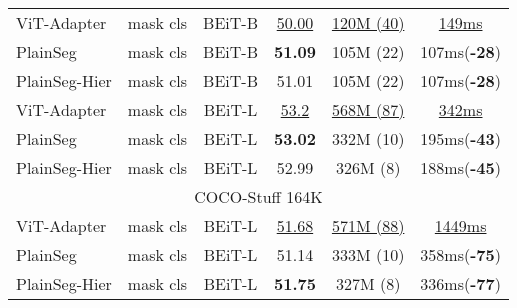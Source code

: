 \documentclass{article} \usepackage{iclr2024_conference,times}
\begin{document}
\begin{table}[h]
\begin{center}
\begin{tabular}{l|ccccc}
ViT-Adapter  &mask cls  &BEiT-B &\uline{50.00} &\uline{120M (40)}  & \uline{149ms}\\
PlainSeg &mask cls &BEiT-B &\textbf{51.09}  &105M (22) &107ms(\textbf{-28})  \\
PlainSeg-Hier &mask cls &BEiT-B &51.01  &105M (22) &107ms(\textbf{-28})  \\
ViT-Adapter  &mask cls  &BEiT-L &\uline{53.2} &\uline{568M (87)}   &\uline{342ms}\\
PlainSeg &mask cls &BEiT-L &\textbf{53.02}  &332M (10) &195ms(\textbf{-43})  \\
PlainSeg-Hier &mask cls &BEiT-L &52.99  &326M (8) &188ms(\textbf{-45})  \\\midrule\midrule
\multicolumn{6}{c}{COCO-Stuff 164K} \\ \midrule
ViT-Adapter  &mask cls  &BEiT-L &\uline{51.68} &\uline{571M (88)}  &\uline{1449ms} \\
PlainSeg &mask cls &BEiT-L &51.14  &333M (10) &358ms(\textbf{-75})   \\
PlainSeg-Hier &mask cls &BEiT-L &\textbf{51.75}  &327M (8) &336ms(\textbf{-77})   \\
\bottomrule
\end{tabular}
\end{center}
\end{table}
\end{document}
